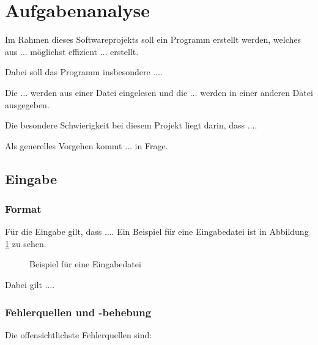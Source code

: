 \section{Aufgabenanalyse}
\label{sec:aufgabenanalyse}

Im Rahmen dieses Softwareprojekts soll ein Programm erstellt werden, welches aus $\ldots$ möglichst effizient $\ldots$ erstellt.

Dabei soll das Programm insbesondere $\ldots$.

Die $\ldots$ werden aus einer Datei eingelesen und die $\ldots$ werden in einer anderen Datei ausgegeben.

Die besondere Schwierigkeit bei diesem Projekt liegt darin, dass $\ldots$.

Als generelles Vorgehen kommt $\ldots$ in Frage.

\subsection{Eingabe}
\label{ssec:eingabe}


\subsubsection{Format}
\label{sssec:format}

Für die Eingabe gilt, dass $\ldots$.
Ein Beispiel für eine Eingabedatei ist in Abbildung \ref{fig:example_input} zu sehen.

\begin{figure}[H]
    \centering
    
    \caption{Beispiel für eine Eingabedatei}
    \label{fig:example_input}
\end{figure}

Dabei gilt $\ldots$.

\subsubsection{Fehlerquellen und -behebung}
\label{sssec:fehlerquellen_und_-behebung}

Die offensichtlichste Fehlerquellen sind:

